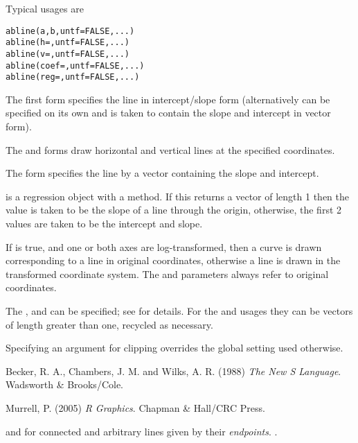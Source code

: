 %
\begin{Details}\relax
Typical usages are
\begin{alltt}abline(a, b, untf = FALSE, ...)
abline(h=, untf = FALSE, ...)
abline(v=, untf = FALSE, ...)
abline(coef=, untf = FALSE, ...)
abline(reg=, untf = FALSE, ...)
\end{alltt}

The first form specifies the line in intercept/slope form
(alternatively  can be specified on its own and is taken to
contain the slope and intercept in vector form).

The  and  forms draw horizontal and vertical lines
at the specified coordinates.

The  form specifies the line by a vector containing the
slope and intercept.

 is a regression object with a  method.
If this returns a vector of length 1 then the value is taken to be the
slope of a line through the origin, otherwise, the first 2 values are
taken to be the intercept and slope.

If  is true, and one or both axes are log-transformed, then
a curve is drawn corresponding to a line in original coordinates,
otherwise a line is drawn in the transformed coordinate system. The
 and  parameters always refer to original coordinates.

The  ,  and 
can be specified; see  for details.  For the
 and  usages they can be vectors of length greater
than one, recycled as necessary.

Specifying an  argument for clipping overrides
the global  setting used otherwise.
\end{Details}
%
\begin{References}\relax
Becker, R. A., Chambers, J. M. and Wilks, A. R. (1988)
\emph{The New S Language}.
Wadsworth \& Brooks/Cole.

Murrell, P. (2005) \emph{R Graphics}. Chapman \& Hall/CRC Press.
\end{References}
%
\begin{SeeAlso}\relax
{} and  for connected and
arbitrary lines given by their \emph{endpoints}.
.
\end{SeeAlso}
%
